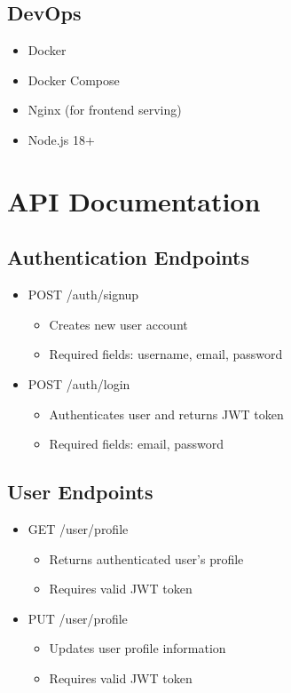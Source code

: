 \documentclass{article}
\begin{document}
\subsection{DevOps}
\begin{itemize}
    \item Docker
    \item Docker Compose
    \item Nginx (for frontend serving)
    \item Node.js 18+
\end{itemize}

\section{API Documentation}

\subsection{Authentication Endpoints}
\begin{itemize}
    \item POST /auth/signup
    \begin{itemize}
        \item Creates new user account
        \item Required fields: username, email, password
    \end{itemize}
    \item POST /auth/login
    \begin{itemize}
        \item Authenticates user and returns JWT token
        \item Required fields: email, password
    \end{itemize}
\end{itemize}

\subsection{User Endpoints}
\begin{itemize}
    \item GET /user/profile
    \begin{itemize}
        \item Returns authenticated user's profile
        \item Requires valid JWT token
    \end{itemize}
    \item PUT /user/profile
    \begin{itemize}
        \item Updates user profile information
        \item Requires valid JWT token
    \end{itemize}
\end{itemize}
\end{document}

